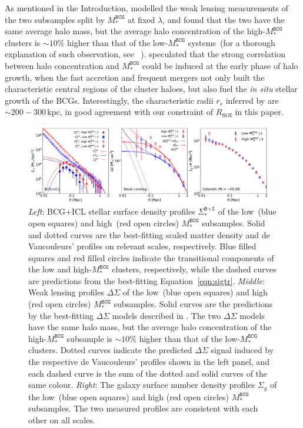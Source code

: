 \documentclass[fleqn,usenatbib]{mnras}
\newcommand{\rsoi}{R_{\mathrm{SOI}}}
\newcommand{\sigbi}{\Sigma_*^{\texttt{B+I}}}
\newcommand{\sigg}{\Sigma_g}
\newcommand{\msbcg}{M_*^{\texttt{BCG}}}
\newcommand{\kpc}{\mathrm{kpc}}
\newcommand{\ds}{\Delta\Sigma}
\begin{document}
As mentioned in the Introduction,  modelled the weak
lensing measurements of the two subsamples split by $\msbcg$ at fixed
$\lambda$, and found that the two have the same average halo mass, but the
average halo concentration of the high-$\msbcg$ clusters is
${\sim}10\%$ higher than that of the low-$\msbcg$ systems~(for a thorough
explanation of such observation, see ~\citet{Zu2022}).
 speculated that the strong correlation between halo
concentration and $\msbcg$ could be induced at the early phase of halo
growth, when the fast accretion and frequent mergers not only built the
characteristic central regions of the cluster haloes, but also fuel the {\it in situ}
stellar growth of the BCGs. Interestingly, the characteristic radii $r_s$
inferred by  are ${\sim}200{-}300\,\kpc$, in good
agreement with our constraint of $\rsoi$ in this paper.


\begin{figure}
    \centering\includegraphics[width=0.96\textwidth]{fig/subsamples_SB_SM.pdf}
    \caption{{\it Left}: BCG+ICL stellar surface density profiles $\sigbi$
    of the low~(blue open squares) and high~(red open circles) $\msbcg$
    subsamples. Solid and dotted curves are the best-fitting scaled matter
    density and de Vaucouleurs' profiles on relevant scales, respectively.
    Blue filled squares and red filled circles indicate the transitional
    components of the low and high-$\msbcg$ clusters, respectively, while
    the dashed curves are predictions from the best-fitting
    Equation~\ref{eqn:sigtr}.  {\it Middle}: Weak lensing profiles $\ds$ of
    the low~(blue open squares) and high (red open circles) $\msbcg$
    subsamples. Solid curves are the predictions by the best-fitting $\ds$
    models described in . The two $\ds$ models have the
    same halo mass, but the average halo concentration of the high-$\msbcg$
    subsample is ${\sim}10\%$ higher than that of the low-$\msbcg$ clusters. Dotted
    curves indicate the predicted $\ds$ signal induced by the respective de
    Vaucouleurs' profiles shown in the left panel, and each dashed curve is
    the sum of the dotted and solid curves of the same colour.  {\it
    Right}: The galaxy surface number density profiles $\sigg$ of the
    low~(blue open squares) and high (red open circles) $\msbcg$
    subsamples. The two measured profiles are consistent with each other on
    all scales.  \label{fig:subdecomposition}}
\end{figure}
\end{document}
